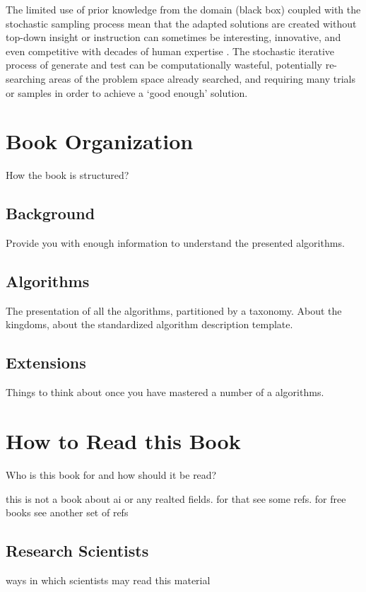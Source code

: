 The limited use of prior knowledge from the domain (black box) coupled with the stochastic sampling process mean that the adapted solutions are created without top-down insight or instruction can sometimes be interesting, innovative, and even competitive with decades of human expertise \cite{Koza2003}. The stochastic iterative process of generate and test can be computationally wasteful, potentially re-searching areas of the problem space already searched, and requiring many trials or samples in order to achieve a `good enough' solution.




% 
% 
\section{Book Organization}
\label{intro:sec:organization}
How the book is structured?

\subsection{Background}
Provide you with enough information to understand the presented algorithms.

\subsection{Algorithms}
The presentation of all the algorithms, partitioned by a taxonomy. 
About the kingdoms, about the standardized algorithm description template.

\subsection{Extensions}
Things to think about once you have mastered a number of a algorithms.


% 
% 
\section{How to Read this Book}
\label{intro:sec:how_to_read}
Who is this book for and how should it be read?

this is not a book about ai or any realted fields. for that see some refs. 
for free books see another set of refs

\subsection{Research Scientists}
ways in which scientists may read this material

